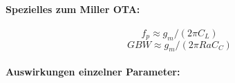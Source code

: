 \paragraph{Spezielles zum Miller OTA:}

\[
    f_p \approx g_m / (2\pi C_L)
\]
\[
    GBW \approx g_m / (2\pi R a C_C)
\]

\paragraph{Auswirkungen einzelner Parameter:}

